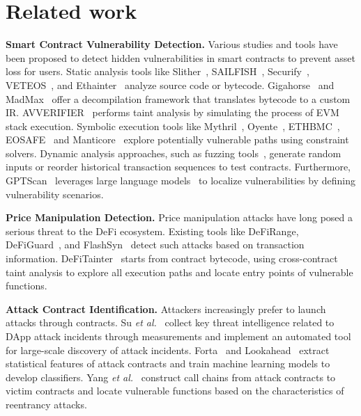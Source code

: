 \section{Related work}
\label{sec:related}


\noindent \textbf{Smart Contract Vulnerability Detection.} Various studies and tools have been proposed to detect hidden vulnerabilities in smart contracts to prevent asset loss for users. Static analysis tools like Slither~\cite{feist2019slither}, SAILFISH~\cite{bose2022sailfish},  Securify~\cite{tsankov2018securify}, VETEOS~\cite{liveteos}, and Ethainter~\cite{brent2020ethainter} analyze source code or bytecode. Gigahorse~\cite{grech2019gigahorse, grech2022elipmoc}  and MadMax~\cite{grech2018madmax} offer a decompilation framework that translates bytecode to a custom IR. AVVERIFIER~\cite{sun2024all} performs taint analysis by simulating the process of EVM stack execution. Symbolic execution tools like Mythril~\cite{mythril}, Oyente~\cite{luu2016making}, ETHBMC~\cite{frank2020ethbmc}, EOSAFE~\cite{he2021eosafe} and Manticore~\cite{mossberg2019manticore} explore potentially vulnerable paths using constraint solvers. Dynamic analysis approaches, such as fuzzing tools~\cite{jiang2018contractfuzzer, grieco2020echidna, manes2018fuzzing, choi2021smartian, shou2023ityfuzz, wustholz2020harvey, he2019learning, ye2023detecting}, generate random inputs or reorder historical transaction sequences to test contracts. Furthermore, GPTScan~\cite{sun2024gptscan} leverages large language models~\cite{he2024large} to localize vulnerabilities by defining vulnerability scenarios.


\noindent \textbf{Price Manipulation Detection.} Price manipulation attacks have long posed a serious threat to the DeFi ecosystem. Existing tools like DeFiRange\cite{wu2023defiranger}, DeFiGuard~\cite{wang2024defiguard}, and FlashSyn~\cite{chen2024flashsyn} detect such attacks based on transaction information. DeFiTainter~\cite{kong2023defitainter} starts from contract bytecode, using cross-contract taint analysis to explore all execution paths and locate entry points of vulnerable functions.


\noindent \textbf{Attack Contract Identification.} Attackers increasingly prefer to launch attacks through contracts. Su \textit{et al.}~\cite{su2021evil} collect key threat intelligence related to DApp attack incidents through measurements and implement an automated tool for large-scale discovery of attack incidents. Forta~\cite{forta} and Lookahead~\cite{ren2024lookahead} extract statistical features of attack contracts and train machine learning models to develop classifiers. Yang \textit{et al.}~\cite{yang2024uncover} construct call chains from attack contracts to victim contracts and locate vulnerable functions based on the characteristics of reentrancy attacks.

